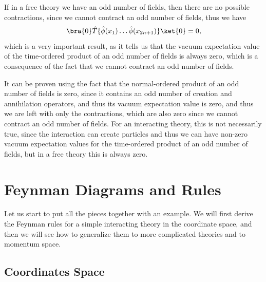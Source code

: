 \begin{corollary}
    If in a free theory we have an odd number of fields, then there are no possible contractions, since we cannot contract an odd number of fields, thus we have
    \[
        \bra{0} \hat{T} \{ \hat{\phi} (x_1) \dots \hat{\phi} (x_{2n+1}) \} \ket{0} = 0,
    \]
    which is a very important result, as it tells us that the vacuum expectation value of the time-ordered product of an odd number of fields is always zero, which is a consequence of the fact that we cannot contract an odd number of fields.

    It can be proven using the fact that the normal-ordered product of an odd number of fields is zero, since it contains an odd number of creation and annihilation operators, and thus its vacuum expectation value is zero, and thus we are left with only the contractions, which are also zero since we cannot contract an odd number of fields. For an interacting theory, this is not necessarily true, since the interaction can create particles and thus we can have non-zero vacuum expectation values for the time-ordered product of an odd number of fields, but in a free theory this is always zero.
\end{corollary}


\section{Feynman Diagrams and Rules}

Let us start to put all the pieces together with an example. We will first derive the Feynman rules for a simple interacting theory in the coordinate space, and then we will see how to generalize them to more complicated theories and to momentum space.

\subsection{Coordinates Space}

